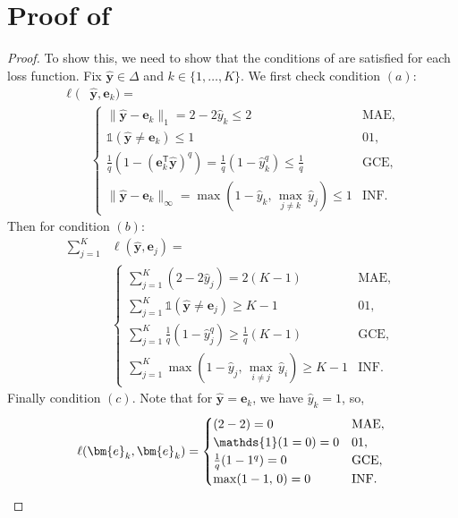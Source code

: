 \documentclass[letterpaper]{article} %
\newcommand{\by}{{\bm{y}}}
\newcommand{\be}{{\bm{e}}}
\newcommand{\T}{{\mathsf{T}}}
\newcommand{\I}{\mathds{1}}
\newcommand{\simplex}{\Delta}
\begin{document}
\section{Proof of }
\label{app:cor_robust_losses}
\rl*
\begin{proof}
To show this, we need to show that the conditions of  are satisfied for each loss function.
Fix
$\widehat{\by}\in\simplex$
and
$k\in\{1,\ldots,K\}$. We first check condition $(a)$:
\begin{align*}
    \ell( & \widehat{\by}  ,\be_k) =
    \\
    &\begin{cases}
        \|\widehat{\by}-\be_k\|_1 = 2-2\widehat{y}_k \leq 2 & \mathrm{MAE},
        \\
        \I(\widehat{\by}\ne \be_k)  \leq 1 & 01,
        \\
        \frac{1}{q}(1-(\be_k^\T\widehat{\by})^q) = \frac{1}{q}(1-\widehat{y}_k^q) \leq \frac{1}{q} & \mathrm{GCE},
        \\
        \|\widehat{\by}-\be_k\|_\infty = \max(1-\widehat{y}_k,\,\underset{j\ne k}{\max}\,\widehat{y}_j)\leq 1 & \mathrm{INF}.
    \end{cases}
\end{align*}
Then for condition $(b)$:
\begin{align*}
    \sum_{j=1}^K & \ell(\widehat{\by},\be_j) =
        \\
        &\begin{cases}
        \sum_{j=1}^K (2-2\widehat{y}_j) = 2(K-1) & \mathrm{MAE},
        \\
        \sum_{j=1}^K \I(\widehat{\by}\ne \be_j) \geq K-1 & 01,
        \\
        \sum_{j=1}^K \frac{1}{q}(1-\widehat{y}_j^q)
        \geq
        \frac{1}{q}(K-1)   & \mathrm{GCE},
        \\
        \sum_{j=1}^K \max(1-\widehat{y}_j,\,\underset{i\ne j}{\max}\,\widehat{y}_i)
        \geq
        K-1 & \mathrm{INF}.
    \end{cases}
\end{align*}
Finally condition $(c)$. Note that for $\widehat{\by}=\be_k$, we have $\widehat{y}_k=1$, so,
\[
    \ell(\be_k,\be_k) =
        \begin{cases}
        (2-2) = 0 & \mathrm{MAE},
        \\
        \I(1=0) = 0 & 01,
        \\
        \frac{1}{q}(1-1^q) =0   & \mathrm{GCE},
        \\
        \max(1-1,\,0) = 0 & \mathrm{INF}.
    \end{cases} \qedhere
\]
\end{proof}
\end{document}
